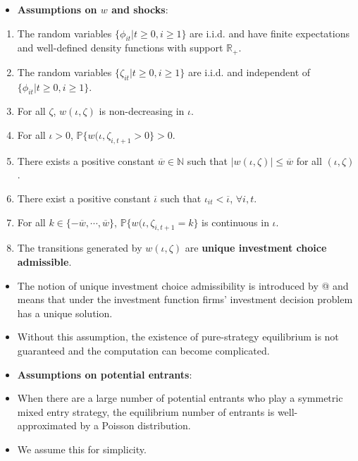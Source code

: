\documentclass[]{book}
\providecommand{\tightlist}{%
  \setlength{\itemsep}{0pt}\setlength{\parskip}{0pt}}
\begin{document}
\begin{itemize}
\tightlist
\item
  \textbf{Assumptions on \(w\) and shocks}:
\end{itemize}

\begin{enumerate}
\def\labelenumi{\arabic{enumi}.}
\tightlist
\item
  The random variables \(\{\phi_{it}| t \ge 0, i \ge 1\}\) are i.i.d.
  and have finite expectations and well-defined density functions with
  support \(\mathbb{R}_+\).
\item
  The random variables \(\{\zeta_{it}| t \ge 0, i \ge 1\}\) are i.i.d.
  and independent of \(\{\phi_{it}| t \ge 0, i \ge 1\}\).
\item
  For all \(\zeta\), \(w(\iota, \zeta)\) is non-decreasing in \(\iota\).
\item
  For all \(\iota > 0\),
  \(\mathbb{P}\{w(\iota, \zeta_{i, t + 1} > 0\} > 0\).
\item
  There exists a positive constant \(\overline{w} \in \mathbb{N}\) such
  that \(|w(\iota, \zeta)| \le \overline{w}\) for all
  \((\iota, \zeta)\).
\item
  There exist a positive constant \(\overline{\iota}\) such that
  \(\iota_{it} < \overline{\iota}\), \(\forall i, t\).
\item
  For all \(k \in \{- \overline{w}, \cdots, \overline{w}\}\),
  \(\mathbb{P}\{w(\iota, \zeta_{i, t + 1} = k\}\) is continuous in
  \(\iota\).
\item
  The transitions generated by \(w(\iota, \zeta)\) are \textbf{unique
  investment choice admissible}.
\end{enumerate}

\begin{itemize}
\tightlist
\item
  The notion of unique investment choice admissibility is introduced by
  @\citet{doraszelskiComputableMarkovperfectIndustry2010} and means that
  under the investment function firms' investment decision problem has a
  unique solution.
\item
  Without this assumption, the existence of pure-strategy equilibrium is
  not guaranteed and the computation can become complicated.
\item
  \textbf{Assumptions on potential entrants}:
\item
  When there are a large number of potential entrants who play a
  symmetric mixed entry strategy, the equilibrium number of entrants is
  well-approximated by a Poisson distribution.
\item
  We assume this for simplicity.
\end{itemize}
\end{document}
